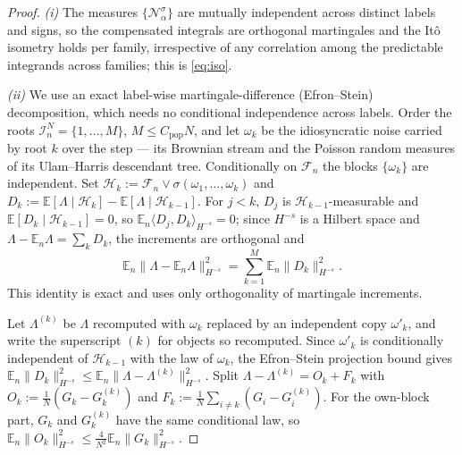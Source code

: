 \documentclass[a4paper,fleqn]{cas-sc}
\theoremstyle{definition}
\theoremstyle{remark}
\begin{document}
\begin{proof}
\emph{(i)} The measures $\{\mathcal N^\sigma_\alpha\}$ are mutually independent across
distinct labels and signs, so the compensated integrals are orthogonal martingales and
the It\^o isometry holds per family, irrespective of any correlation among the predictable
integrands across families; this is \eqref{eq:iso}.

\emph{(ii)} We use an exact label-wise martingale-difference (Efron--Stein) decomposition,
which needs no conditional independence across labels. Order the roots
$\mathcal I^N_n=\{1,\dots,M\}$, $M\le C_{\mathrm{pop}}N$, and let $\omega_k$ be the
idiosyncratic noise carried by root $k$ over the step --- its Brownian stream and the Poisson
random measures of its Ulam--Harris descendant tree. Conditionally on $\mathcal F_n$ the
blocks $\{\omega_k\}$ are independent. Set $\mathcal H_k:=\mathcal F_n\vee\sigma(\omega_1,\dots,\omega_k)$
and $D_k:=\mathbb E[\Lambda\mid\mathcal H_k]-\mathbb E[\Lambda\mid\mathcal H_{k-1}]$. For $j<k$,
$D_j$ is $\mathcal H_{k-1}$-measurable and $\mathbb E[D_k\mid\mathcal H_{k-1}]=0$, so
$\mathbb E_n\langle D_j,D_k\rangle_{H^{-s}}=0$; since $H^{-s}$ is a Hilbert space and
$\Lambda-\mathbb E_n\Lambda=\sum_kD_k$, the increments are orthogonal and
\[
\mathbb E_n\|\Lambda-\mathbb E_n\Lambda\|_{H^{-s}}^2=\sum_{k=1}^M\mathbb E_n\|D_k\|_{H^{-s}}^2 .
\]
This identity is exact and uses only orthogonality of martingale increments.

Let $\Lambda^{(k)}$ be $\Lambda$ recomputed with $\omega_k$ replaced by an independent copy
$\omega'_k$, and write the superscript $(k)$ for objects so recomputed. Since $\omega'_k$ is
conditionally independent of $\mathcal H_{k-1}$ with the law of $\omega_k$, the Efron--Stein
projection bound gives $\mathbb E_n\|D_k\|_{H^{-s}}^2\le\mathbb E_n\|\Lambda-\Lambda^{(k)}\|_{H^{-s}}^2$.
Split $\Lambda-\Lambda^{(k)}=O_k+F_k$ with $O_k:=\frac1N(G_k-G^{(k)}_k)$ and
$F_k:=\frac1N\sum_{i\ne k}(G_i-G^{(k)}_i)$. For the own-block part, $G_k$ and $G^{(k)}_k$ have
the same conditional law, so $\mathbb E_n\|O_k\|_{H^{-s}}^2\le\frac4{N^2}\mathbb E_n\|G_k\|_{H^{-s}}^2$.


\end{proof}
\end{document}

